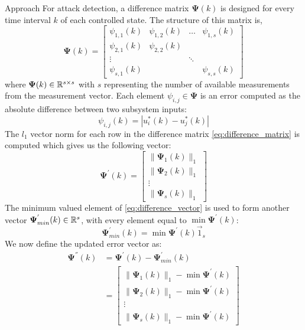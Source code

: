 \begin{section}{Approach}
For attack detection, a difference matrix $\bm{\Psi}(k)$ is designed for every time interval $k$ of each controlled state. The structure of this matrix is,
    \begin{equation}
    \label{eq:difference_matrix}
	\bm{\Psi}(k)=\begin{bmatrix} \psi_{1,1}(k) & \psi_{1,2}(k) & \dots & \psi_{1,s}(k) \\ \psi_{2,1}(k) & \psi_{2,2}(k) &  &  \\ \vdots &  & \ddots &  \\ \psi_{s,1}(k) &  &  & \psi_{s,s}(k) \end{bmatrix}
	\end{equation}
where $\bm{\Psi}(k) \in \mathbb{R}^{s\times s}$ with $s$ representing the number of available measurements from the measurement vector. Each element $\psi_{i,j}\in\bm{\Psi}$ is an error computed as the absolute difference between two subsystem inputs:
    \begin{equation}
        \psi_{i,j}(k)=|u^*_i(k)-u^*_j(k)|
    \end{equation}
The $l_1$ vector norm for each row in the difference matrix \eqref{eq:difference_matrix} is computed which gives us the following vector:
    \begin{equation}
    \label{eq:difference_vector}
	\bm{\Psi^{'}}(k)=\begin{bmatrix} \lVert{\bm{\Psi}_1(k)}\rVert_1 \\ \lVert{\bm{\Psi}_2(k)}\rVert_1 \\ \vdots \\ \lVert{\bm{\Psi}_s(k)}\rVert_1 \end{bmatrix}
	\end{equation}
The minimum valued element of \eqref{eq:difference_vector} is used to form another vector $\bm{\Psi}^{'}_{min}(k) \in \mathbb{R}^s$, with every element equal to $\min \bm{\Psi}^{'}(k)$:
    \begin{equation}
	\bm{\Psi}^{'}_{min}(k)=\min \bm{\Psi}^{'}(k) \vec{1}_s
	\end{equation}
We now define the updated error vector as:
    \begin{align}
    \label{eq:Psi2}
	\bm{\Psi}^{''}(k)&=\bm{\Psi}^{'}(k)-\bm{\Psi}^{'}_{min}(k) \\
	& =\begin{bmatrix} \lVert{\bm{\Psi}_1(k)}\rVert_1 - \min \bm{\Psi}^{'}(k)\\ \lVert{\bm{\Psi}_2(k)}\rVert_1 - \min \bm{\Psi}^{'}(k) \\ \vdots \\ \lVert{\bm{\Psi}_s(k)}\rVert_1 - \min \bm{\Psi}^{'}(k) \end{bmatrix}
	\end{align}
	

\end{section}
